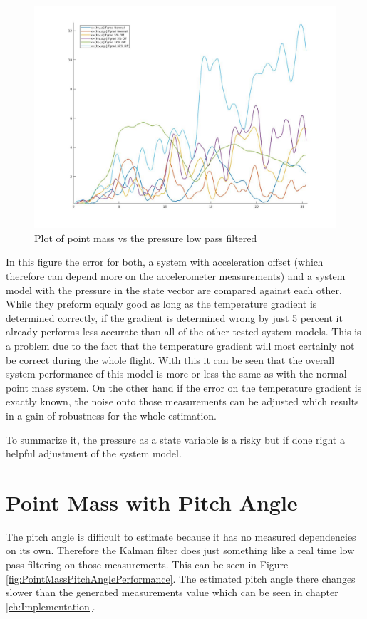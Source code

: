 \begin{figure}[h!]
 \centering
 \includegraphics[width=.8 \textwidth]{./Pictures/PointMassVSPressure.jpg}
 \caption{Plot of point mass vs the pressure low pass filtered}
 \label{fig:PointMassVSPressure}
\end{figure}

In this figure the error for both, a system with acceleration offset (which therefore can depend more on the accelerometer measurements)
and a system model with the pressure in the state vector are compared against each other.
While they preform equaly good as long as the temperature gradient is determined correctly,
if the gradient is determined wrong by just 5 percent it already performs less accurate than all of the other tested system models.
This is a problem due to the fact that the temperature gradient will most certainly not be correct during the whole flight.
With this it can be seen that the overall system performance of this model is more or less the same as with the normal point mass system.
On the other hand if the error on the temperature gradient is exactly known, the noise onto those measurements can be adjusted which
results in a gain of robustness for the whole estimation.

To summarize it, the pressure as a state variable is a risky but if done right a helpful adjustment of the system model.
\newpage
\section{Point Mass with Pitch Angle}
The pitch angle is difficult to estimate because it has no measured dependencies on its own.
Therefore the Kalman filter does just something like a real time low pass filtering on those measurements.
This can be seen in Figure \ref{fig:PointMassPitchAnglePerformance}. The estimated pitch angle there changes slower than the generated measurements value which can be seen in chapter \ref{ch:Implementation}.

